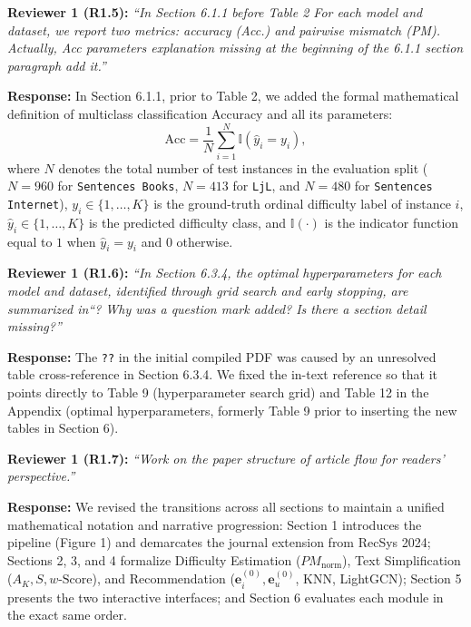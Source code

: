 \documentclass[11pt,a4paper]{article}
\newcommand{\mm}[1]{#1}
\newcommand{\mmhl}[1]{#1}
\begin{document}
\begin{reviewbox}
\textbf{Reviewer 1 (R1.5):} \textit{``In Section 6.1.1 before Table 2 For each model and dataset, we report two metrics: accuracy (Acc.) and pairwise mismatch (PM). Actually, Acc parameters explanation missing at the beginning of the 6.1.1 section paragraph add it.''}
\end{reviewbox}

\noindent\textbf{Response:}
In Section 6.1.1, prior to Table 2, we added the formal mathematical definition of multiclass classification Accuracy and all its parameters:
\begin{equation}
\text{Acc} = \frac{1}{N} \sum_{i=1}^{N} \mathbb{I}(\hat{y}_i = y_i),
\label{eq:rebuttal_accuracy}
\end{equation}
where $N$ denotes the total number of test instances in the evaluation split ($N = 960$ for \texttt{Sentences Books}, $N = 413$ for \texttt{LjL}, and $N = 480$ for \texttt{Sentences Internet}), $y_i \in \{1, \dots, K\}$ is the ground-truth ordinal difficulty label of instance $i$, $\hat{y}_i \in \{1, \dots, K\}$ is the predicted difficulty class, and $\mathbb{I}(\cdot)$ is the indicator function equal to $1$ when $\hat{y}_i = y_i$ and $0$ otherwise.

\begin{reviewbox}
\textbf{Reviewer 1 (R1.6):} \textit{``In Section 6.3.4, the optimal hyperparameters for each model and dataset, identified through grid search and early stopping, are summarized in``? Why was a question mark added? Is there a section detail missing?''}
\end{reviewbox}

\noindent\textbf{Response:}
The \texttt{??} in the initial compiled PDF was caused by an unresolved table cross-reference in Section 6.3.4. We fixed the in-text reference so that it points directly to Table \mmhl{9} (hyperparameter search grid) and Table \mmhl{12} in the Appendix (optimal hyperparameters, formerly Table 9 prior to inserting the \mm{new} tables in Section 6).

\begin{reviewbox}
\textbf{Reviewer 1 (R1.7):} \textit{``Work on the paper structure of article flow for readers' perspective.''}
\end{reviewbox}

\noindent\textbf{Response:}
We revised the transitions across all sections to maintain a unified mathematical notation and narrative progression: Section 1 introduces the pipeline (Figure 1) and demarcates the journal extension from RecSys 2024; Sections 2, 3, and 4 formalize Difficulty Estimation ($PM_{\text{norm}}$), Text Simplification ($A_K, S, w\text{-Score}$), and Recommendation ($\mathbf{e}_i^{(0)}, \mathbf{e}_u^{(0)}$, KNN, LightGCN); Section 5 presents the two interactive interfaces; and Section 6 evaluates each module in the exact same order.
\end{document}
